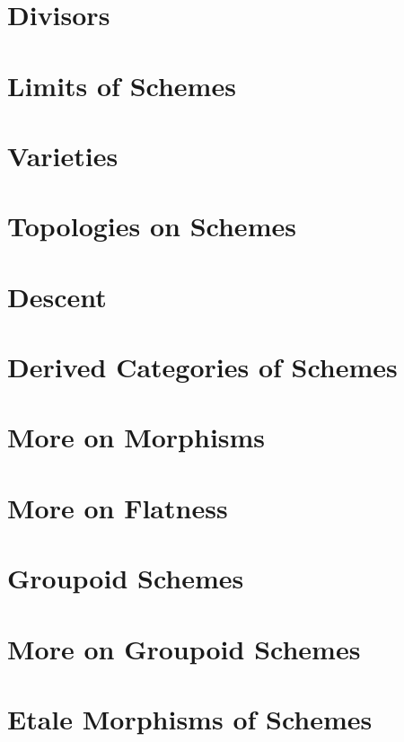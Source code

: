 \chapter{Divisors}
\label{chap:divisors}


\chapter{Limits of Schemes}
\label{chap:limits}


\chapter{Varieties}
\label{chap:varieties}


\chapter{Topologies on Schemes}
\label{chap:topologies}


\chapter{Descent}
\label{chap:descent}


\chapter{Derived Categories of Schemes}
\label{chap:perfect}


\chapter{More on Morphisms}
\label{chap:more-morphisms}


\chapter{More on Flatness}
\label{chap:flat}


\chapter{Groupoid Schemes}
\label{chap:groupoids}


\chapter{More on Groupoid Schemes}
\label{chap:more-groupoids}


\chapter{Etale Morphisms of Schemes}
\label{chap:etale}

